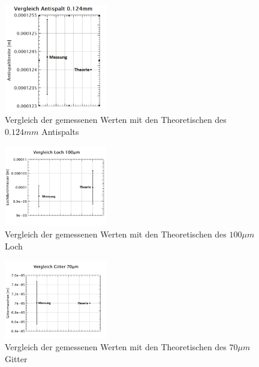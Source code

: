 \begin{figure}[H]
	\centering
	\includegraphics[width=0.4\textwidth]{data/dis_asp_12.png}
	\caption{Vergleich der gemessenen Werten mit den Theoretischen des $0.124mm$ Antispalts}
	\label{fig:dis_aspalt_12}
\end{figure}
\begin{figure}[H]
	\centering
	\includegraphics[width=0.4\textwidth]{data/dis_loch_100.png}
	\caption{Vergleich der gemessenen Werten mit den Theoretischen des $100\mu m$ Loch}
	\label{fig:dis_loch_100}
\end{figure}
\begin{figure}[H]
	\centering
	\includegraphics[width=0.4\textwidth]{data/dis_gitter.png}
	\caption{Vergleich der gemessenen Werten mit den Theoretischen des $70\mu m$ Gitter}
	\label{fig:dis_gitter}
\end{figure}

